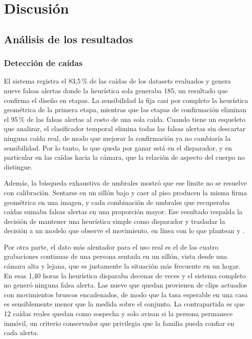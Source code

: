 \chapter{Discusión}\label{chapter06}

\section{Análisis de los resultados}
\label{sec:analisis_resultados}

\subsection{Detección de caídas}

El sistema registra el 83,5\,\% de las caídas de los datasets evaluados y genera nueve falsas alertas donde la heurística sola generaba 185, un resultado que confirma el diseño en etapas.
La sensibilidad la fija casi por completo la heurística geométrica de la primera etapa, mientras que las etapas de confirmación eliminan el 95\,\% de las falsas alertas al costo de una sola caída.
Cuando tiene un esqueleto que analizar, el clasificador temporal elimina todas las falsas alertas sin descartar ninguna caída real, de modo que mejorar la confirmación ya no cambiaría la sensibilidad.
Por lo tanto, lo que queda por ganar está en el disparador, y en particular en las caídas hacia la cámara, que la relación de aspecto del cuerpo no distingue.

Además, la búsqueda exhaustiva de umbrales mostró que ese límite no se resuelve con calibración.
Sentarse en un sillón bajo y caer al piso producen la misma firma geométrica en una imagen, y cada combinación de umbrales que recuperaba caídas sumaba falsas alertas en una proporción mayor.
Ese resultado respalda la decisión de mantener una heurística simple como disparador y trasladar la decisión a un modelo que observe el movimiento, en línea con lo que plantean \textcite{Ramirez2022} y \textcite{Wang2024}.

Por otra parte, el dato más alentador para el uso real es el de las cuatro grabaciones continuas de una persona sentada en un sillón, vista desde una cámara alta y lejana, que es justamente la situación más frecuente en un hogar.
En esas 1,40 horas la heurística disparaba decenas de veces y el sistema completo no generó ninguna falsa alerta.
Las nueve que quedan provienen de clips actuados con movimientos bruscos encadenados, de modo que la tasa esperable en una casa es sensiblemente menor que la medida sobre el conjunto.
La contrapartida es que 12 caídas reales quedan como sospecha y solo avisan si la persona permanece inmóvil, un criterio conservador que privilegia que la familia pueda confiar en cada alerta.

